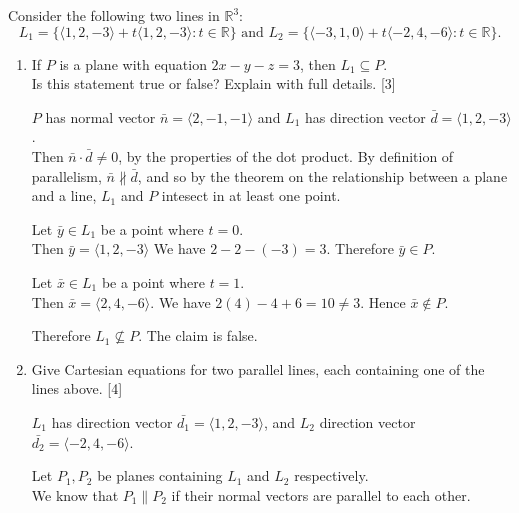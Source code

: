 \documentclass[11pt]{article}
\begin{document}
Consider the following two lines in \(\mathbb{R}^3\):
    \[
        L_1 = \{\langle1,2,-3\rangle + t\langle1,2,-3\rangle : t \in \mathbb{R}\}
        \text{ and }
        L_2 = \{\langle-3,1,0\rangle + t\langle-2,4,-6\rangle : t \in \mathbb{R}\}.
    \]
\begin{enumerate}[label=\alph*), series=Last]
    \item If \(P\) is a plane with equation \(2x-y-z=3\), then \(L_1 \subseteq P\).\\
    Is this statement true or false? Explain with full details. \hfill [3]

    \color{blue}
    \(P\) has normal vector \(\bar{n} = \langle 2,-1,-1\rangle\) and \(L_1\) has direction vector \(\bar{d} = \langle 1,2,-3\rangle\).\\
    Then \(\bar{n} \cdot \bar{d} \neq 0\), by the properties of the dot product. By definition of parallelism, \(\bar{n} \nparallel  \bar{d}\), and
    so by the theorem on the relationship between a plane and a line, \(L_1\) and \(P\) intesect in at least one point.

    Let \(\bar{y} \in L_1\) be a point where \(t= 0\).\\
    Then \(\bar{y} = \langle1,2,-3\rangle\)
    We have \(2 -  2- (-3) = 3\). Therefore \(\bar{y} \in P\).

    \vspace{0.5em}
    Let \(\bar{x} \in L_1\) be a point where \(t = 1\).\\
    Then \(\bar{x} = \langle2,4,-6\rangle.\)
    We have \( 2(4) -4 + 6 = 10 \neq 3\). Hence \(\bar{x} \notin P\). 
    
    \vspace{0.5em}
    Therefore \(L_1 \nsubseteq P\). The claim is false.

    \color{black}

    \item Give Cartesian equations for two parallel lines, each containing one of the lines above. \hfill [4]
    \color{blue}

    \(L_1\) has direction vector \(\bar{d_1} = \langle1,2,-3\rangle\), and \(L_2\) direction vector \(\bar{d_2} = \langle-2,4,-6\rangle\).

    Let \(P_1,P_2\) be planes containing \(L_1\) and \(L_2\) respectively.\\
    We know that \(P_1\parallel P_2\) if their normal vectors are parallel to each other.

    \vspace{1em}


\end{enumerate}
\end{document}
